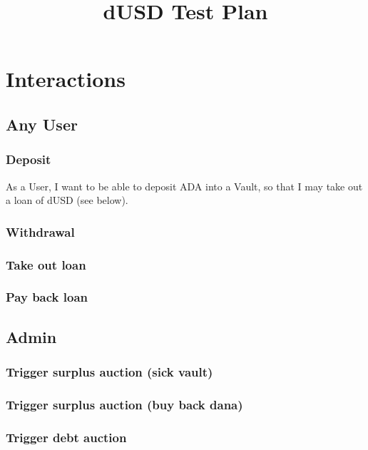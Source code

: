\documentclass{article} %
\title{dUSD Test Plan}
\begin{document}
\maketitle


\section{Interactions}


\subsection{Any User}

\subsubsection{Deposit}

As a User, I want to be able to deposit ADA into a Vault, so that I may take out a loan of dUSD (see below).

\subsubsection{Withdrawal}

\subsubsection{Take out loan}

\subsubsection{Pay back loan}


\subsection{Admin}

\subsubsection{Trigger surplus auction (sick vault)}

\subsubsection{Trigger surplus auction (buy back dana)}

\subsubsection{Trigger debt auction}
\end{document}
